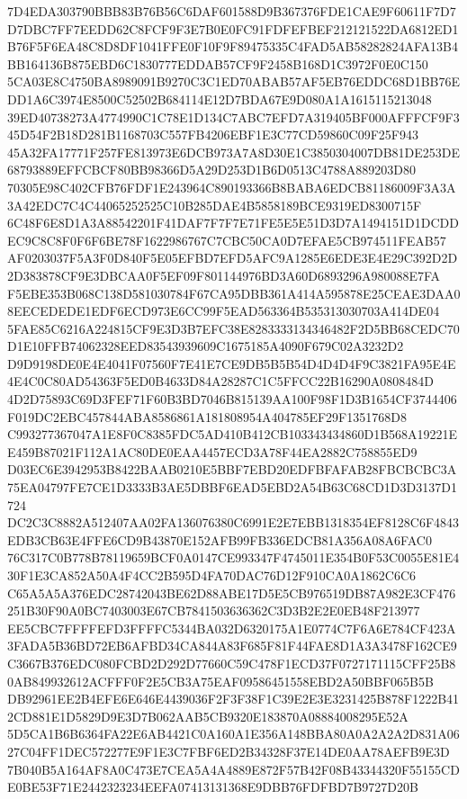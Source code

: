 \documentclass[UTF8,fontset=fandol,zihao=-4,a4paper]{ctexart}
\begin{document}
{{7D4EDA303790BBB83B76B56C6DAF601588D9B367376FDE1CAE9F60611F7D7D7DBC7FF7EEDD62C8FCF9F3E7B0E0FC91FDFEFBEF212121522DA6812ED1
B76F5F6EA48C8D8DF1041FFE0F10F9F89475335C4FAD5AB58282824AFA13B4BB164136B875EBD6C1830777EDDAB57CF9F2458B168D1C3972F0E0C150
5CA03E8C4750BA8989091B9270C3C1ED70ABAB57AF5EB76EDDC68D1BB76EDD1A6C3974E8500C52502B684114E12D7BDA67E9D080A1A1615115213048
39ED40738273A4774990C1C78E1D134C7ABC7EFD7A319405BF000AFFFCF9F345D54F2B18D281B1168703C557FB4206EBF1E3C77CD59860C09F25F943
45A32FA17771F257FE813973E6DCB973A7A8D30E1C3850304007DB81DE253DE68793889EFFCBCF80BB98366D5A29D253D1B6D0513C4788A889203D80
70305E98C402CFB76FDF1E243964C890193366B8BABA6EDCB81186009F3A3A3A42EDC7C4C44065252525C10B285DAE4B5858189BCE9319ED8300715F
6C48F6E8D1A3A88542201F41DAF7F7F7E71FE5E5E51D3D7A1494151D1DCDDEC9C8C8F0F6F6BE78F1622986767C7CBC50CA0D7EFAE5CB974511FEAB57
AF0203037F5A3F0D840F5E05EFBD7EFD5AFC9A1285E6EDE3E4E29C392D2D2D383878CF9E3DBCAA0F5EF09F801144976BD3A60D6893296A980088E7FA
F5EBE353B068C138D581030784F67CA95DBB361A414A595878E25CEAE3DAA08EECEDEDE1EDF6ECD973E6CC99F5EAD563364B535313030703A414DE04
5FAE85C6216A224815CF9E3D3B7EFC38E8283333134346482F2D5BB68CEDC70D1E10FFB74062328EED83543939609C1675185A4090F679C02A3232D2
D9D9198DE0E4E4041F07560F7E41E7CE9DB5B5B54D4D4D4F9C3821FA95E4E4E4C0C80AD54363F5ED0B4633D84A28287C1C5FFCC22B16290A0808484D
4D2D75893C69D3FEF71F60B3BD7046B815139AA100F98F1D3B1654CF3744406F019DC2EBC457844ABA8586861A181808954A404785EF29F1351768D8
C993277367047A1E8F0C8385FDC5AD410B412CB103343434860D1B568A19221EE459B87021F112A1AC80DE0EAA4457ECD3A78F44EA2882C758855ED9
D03EC6E3942953B8422BAAB0210E5BBF7EBD20EDFBFAFAB28FBCBCBC3A75EA04797FE7CE1D3333B3AE5DBBF6EAD5EBD2A54B63C68CD1D3D3137D1724
DC2C3C8882A512407AA02FA136076380C6991E2E7EBB1318354EF8128C6F4843EDB3CB63E4FFE6CD9B43870E152AFB99FB336EDCB81A356A08A6FAC0
76C317C0B778B78119659BCF0A0147CE993347F4745011E354B0F53C0055E81E430F1E3CA852A50A4F4CC2B595D4FA70DAC76D12F910CA0A1862C6C6
C65A5A5A376EDC28742043BE62D88ABE17D5E5CB976519DB87A982E3CF476251B30F90A0BC7403003E67CB7841503636362C3D3B2E2E0EB48F213977
EE5CBC7FFFFEFD3FFFFC5344BA032D6320175A1E0774C7F6A6E784CF423A3FADA5B36BD72EB6AFBD34CA844A83F685F81F44FAE8D1A3A3478F162CE9
C3667B376EDC080FCBD2D292D77660C59C478F1ECD37F0727171115CFF25B80AB849932612ACFFF0F2E5CB3A75EAF09586451558EBD2A50BBF065B5B
DB92961EE2B4EFE6E646E4439036F2F3F38F1C39E2E3E3231425B878F1222B412CD881E1D5829D9E3D7B062AAB5CB9320E183870A08884008295E52A
5D5CA1B6B6364FA22E6AB4421C0A160A1E356A148BBA80A0A2A2A2D831A0627C04FF1DEC572277E9F1E3C7FBF6ED2B34328F37E14DE0AA78AEFB9E3D
7B040B5A164AF8A0C473E7CEA5A4A4889E872F57B42F08B43344320F55155CDE0BE53F71E2442323234EEFA07413131368E9DBB76FDFBD7B9727D20B
}}
\end{document}
